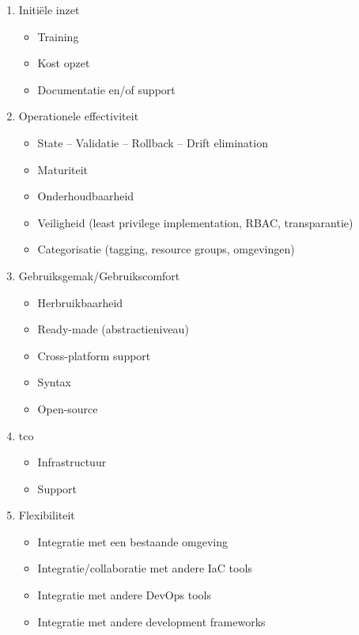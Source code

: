 \begin{enumerate}
    \item Initiële inzet
    \begin{itemize}
        \item Training
        \item Kost opzet
        \item Documentatie en/of support
    \end{itemize}
    \item Operationele effectiviteit
    \begin{itemize}
        \item State – Validatie – Rollback – Drift elimination
        \item Maturiteit
        \item Onderhoudbaarheid
        \item Veiligheid (least privilege implementation, RBAC, transparantie)
        \item Categorisatie (tagging, resource groups, omgevingen)
    \end{itemize}
    \item Gebruiksgemak/Gebruikscomfort
    \begin{itemize}
        \item Herbruikbaarheid
        \item Ready-made (abstractieniveau)
        \item Cross-platform support
        \item Syntax
        \item Open-source
    \end{itemize}
    \item \acrfull{tco}
    \begin{itemize}
        \item Infrastructuur
        \item Support
    \end{itemize}
    \item Flexibiliteit
    \begin{itemize}
        \item Integratie met een bestaande omgeving
        \item Integratie/collaboratie met andere IaC tools
        \item Integratie met andere DevOps tools
        \item Integratie met andere development frameworks
    \end{itemize}
\end{enumerate}

